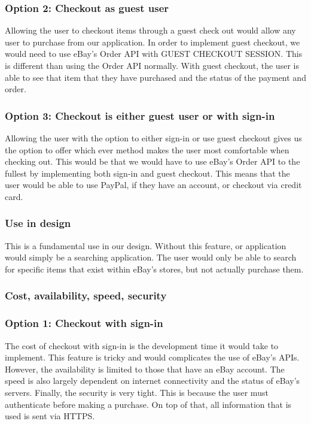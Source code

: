\documentclass[journal,compsoc, 10pt, draftclsnofoot, onecolumn]{IEEEtran}
\begin{document}
\subsubsection*{Option 2: Checkout as guest user}
Allowing the user to checkout items through a guest check out would allow any
user to purchase from our application. In order to implement guest checkout, we
would need to use eBay's Order API with GUEST CHECKOUT SESSION. This is
different than using the Order API normally. With guest checkout, the user is
able to see that item that they have purchased and the status of the payment and
 order.

\subsubsection*{Option 3: Checkout is either guest user or with sign-in}
Allowing the user with the option to either sign-in or use guest checkout gives
us the option to offer which ever method makes the user most comfortable when
checking out. This would be that we would have to use eBay's Order API to the
fullest by implementing both sign-in and guest checkout. This means that the
user would be able to use PayPal, if they have an account, or checkout via
credit card.

\subsubsection{Use in design}
This is a fundamental use in our design. Without this feature, or application
would simply be a searching application. The user would only be able to search
for specific items that exist within eBay's stores, but not actually purchase
them.

\subsubsection{Cost, availability, speed, security}
\subsubsection*{Option 1: Checkout with sign-in}
The cost of checkout with sign-in is the development time it would take to
implement. This feature is tricky and would complicates the use of eBay's APIs.
However, the availability is limited to those that have an eBay account. The
speed is also largely dependent on internet connectivity and the status of
eBay's servers. Finally, the security is very tight. This is because the user
must authenticate before making a purchase. On top of that, all information that 
is used is sent via HTTPS.
\end{document}
